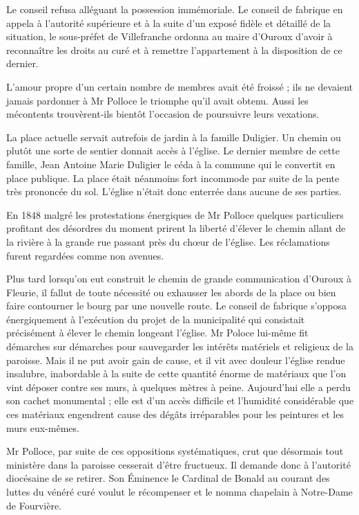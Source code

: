Le conseil refusa alléguant la possession immémoriale. Le conseil de fabrique en appela à l'autorité supérieure et à la suite d'un exposé fidèle et détaillé de la situation, le sous-préfet de Villefranche ordonna au maire d'Ouroux d'avoir à reconnaître les droits au curé et à remettre l'appartement à la disposition de ce dernier.

L'amour propre d'un certain nombre de membres avait été froissé ; ils ne devaient jamais pardonner à Mr Polloce le triomphe qu'il avait obtenu. Aussi les mécontents trouvèrent-ils bientôt l'occasion de poursuivre leurs vexations.

La place actuelle servait autrefois de jardin à la famille Duligier. Un chemin ou plutôt une sorte de sentier donnait accès à l'église. Le dernier membre de cette famille, Jean Antoine Marie Duligier le céda à la commune qui le convertit en place publique. La place était néanmoins fort incommode par suite de la pente très prononcée du sol. L'église n'était donc enterrée dans aucune de ses parties.

En 1848 malgré les protestations énergiques de Mr Polloce quelques particuliers profitant des désordres du moment prirent la liberté d'élever le chemin allant de la rivière à la grande rue passant près du chœur de l'église. Les réclamations furent regardées comme non avenues.

Plus tard lorsqu'on eut construit le chemin de grande communication d'Ouroux à Fleurie, il fallut de toute nécessité ou exhausser les abords de la place ou bien faire contourner le bourg par une nouvelle route. Le conseil de fabrique s'opposa énergiquement à l'exécution du projet de la municipalité qui consistait précisément à élever le chemin longeant l'église. Mr Poloce lui-même fit démarches sur démarches pour sauvegarder les intérêts matériels et religieux de la paroisse. Mais il ne put avoir gain de cause, et il vit avec douleur l'église rendue insalubre, inabordable à la suite de cette quantité énorme de matériaux que l'on vint déposer contre ses murs, à quelques mètres à peine. Aujourd'hui elle a perdu son cachet monumental ; elle est d'un accès difficile et l'humidité considérable que ces matériaux engendrent cause des dégâts irréparables pour les
peintures et les murs eux-mêmes.

Mr Polloce, par suite de ces oppositions systématiques, crut que désormais tout ministère dans la paroisse cesserait d'être fructueux. Il demande donc à l'autorité diocésaine de se retirer. Son Éminence le Cardinal de Bonald au courant des luttes du vénéré curé voulut le récompenser et le nomma chapelain à Notre-Dame de Fourvière.

